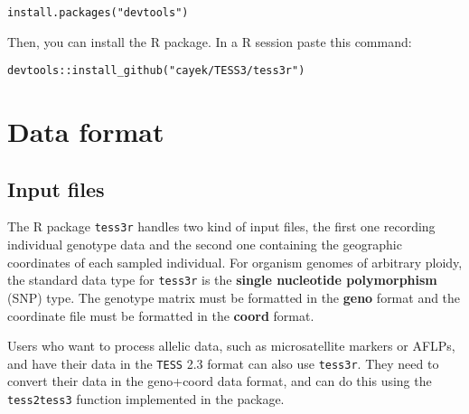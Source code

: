 \documentclass[10pt,a4paper]{article}
\begin{document}
\begin{Verbatim}[frame = single]
install.packages("devtools")
\end{Verbatim}


\noindent Then, you can install the R package. In a R session paste this command:

\begin{Verbatim}[frame = single]
devtools::install_github("cayek/TESS3/tess3r")
\end{Verbatim}


\section{Data format}

\subsection{Input files}

The R package {\tt tess3r} handles two kind of input files, the first one recording individual 
genotype data and the second one containing the geographic coordinates of  each 
sampled individual. For organism genomes of arbitrary ploidy, the standard data 
type for {\tt tess3r} is the {\bf single nucleotide polymorphism} (SNP) type.  
The genotype matrix must be formatted in the {\bf geno} format and the 
coordinate file must be formatted in the {\bf coord} format.

Users who want to process allelic data, such as microsatellite markers or AFLPs, 
and have their data in the {\tt TESS} 2.3 format can also use {\tt tess3r}. They 
need to convert their data in the geno+coord data format, and can do this using 
the {\tt tess2tess3} function implemented in the package.
\end{document}

